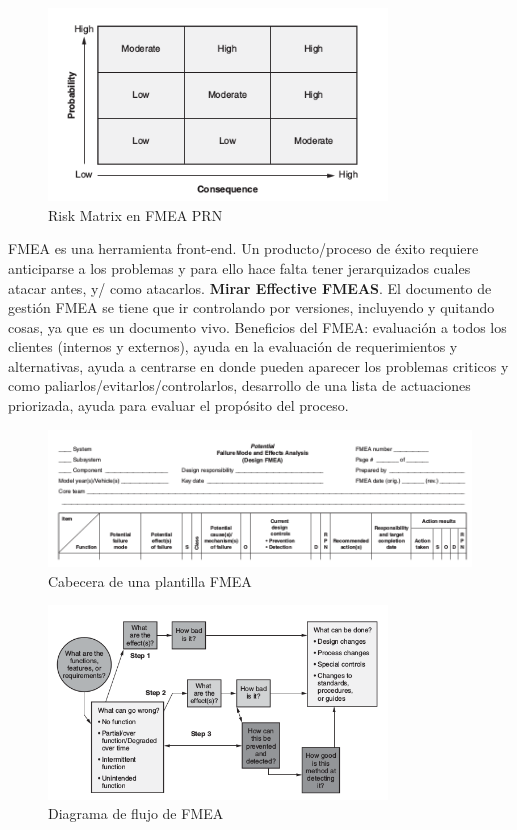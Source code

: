 \documentclass[]{article}
\begin{document}
\begin{figure}[ht!]
	\centering
	\includegraphics[width=90mm]{imagenes/RiskMatrix.png}
	\caption{Risk Matrix en FMEA PRN}
	\label{fig:RiskMatrix}
\end{figure}

FMEA es una herramienta front-end. Un producto/proceso de éxito requiere anticiparse a los problemas y para ello hace falta tener jerarquizados cuales atacar antes, y/ como atacarlos. \textbf{Mirar Effective FMEAS}. El documento de gestión FMEA se tiene que ir controlando por versiones, incluyendo y quitando cosas, ya que es un documento vivo. Beneficios del FMEA: evaluación a todos los clientes (internos y externos), ayuda en la evaluación de requerimientos y alternativas, ayuda a centrarse en donde pueden aparecer los problemas criticos y como paliarlos/evitarlos/controlarlos, desarrollo de una lista de actuaciones priorizada, ayuda para evaluar el propósito del proceso.

\begin{figure}[ht!]
	\centering
	\includegraphics[width=170mm]{imagenes/PlantillaFMEA.png}
	\caption{Cabecera de una plantilla FMEA}
	\label{fig:PlantillaFMEA}
\end{figure}

\begin{figure}[ht!]
	\centering
	\includegraphics[width=90mm]{imagenes/FMEAFlowchart.png}
	\caption{Diagrama de flujo de FMEA}
	\label{fig:FMAFlowchart}
\end{figure}
\end{document}
